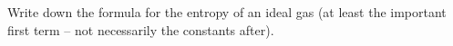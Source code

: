

\vspace*{\fill}
\centering

Write down the formula for the entropy of an ideal gas (at least the important first term -- not necessarily the constants after).

\centering
\vspace*{\fill}

